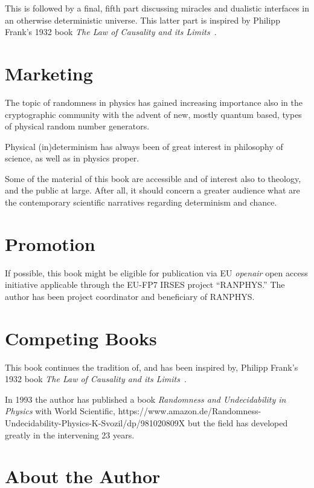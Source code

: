 This is followed by a final, fifth part discussing miracles and dualistic interfaces in an otherwise deterministic universe.
This latter part is inspired by Philipp Frank's 1932 book  {\it The Law of Causality and its Limits}~\cite{frank,franke}.


\chapter*{Marketing}
\label{2016-pu-book-proposal-Marketing}

The topic of randomness in  physics has gained increasing importance also
in the cryptographic community
with the advent of new, mostly quantum based, types of physical random number generators.

Physical (in)determinism has always been of great interest in philosophy of science, as well as in physics proper.

Some of the material of this book are accessible and of interest also to theology, and the public at large.
After all, it should concern a greater audience what are the contemporary scientific narratives regarding
determinism and chance.

\chapter*{Promotion}
\label{2016-pu-book-proposal-Promotion}

If possible, this book might be eligible for publication via EU {\it openair} open access initiative applicable through the  EU-FP7 IRSES project ``RANPHYS.''
The author has been project coordinator and beneficiary of RANPHYS.

\chapter*{Competing Books}
\label{2016-pu-book-proposal-CompetingBooks}

This book continues the tradition of, and has been inspired by, Philipp Frank's 1932 book  {\it The Law of Causality and its Limits}~\cite{frank,franke}.

In 1993 the author has published a book {\it Randomness and Undecidability in Physics} with World Scientific,
https://www.amazon.de/Randomness-Undecidability-Physics-K-Svozil/dp/981020809X
but the field has developed greatly in the intervening 23 years.

\chapter*{About the Author}
\label{2016-pu-book-proposal-AbouttheAuthor}

